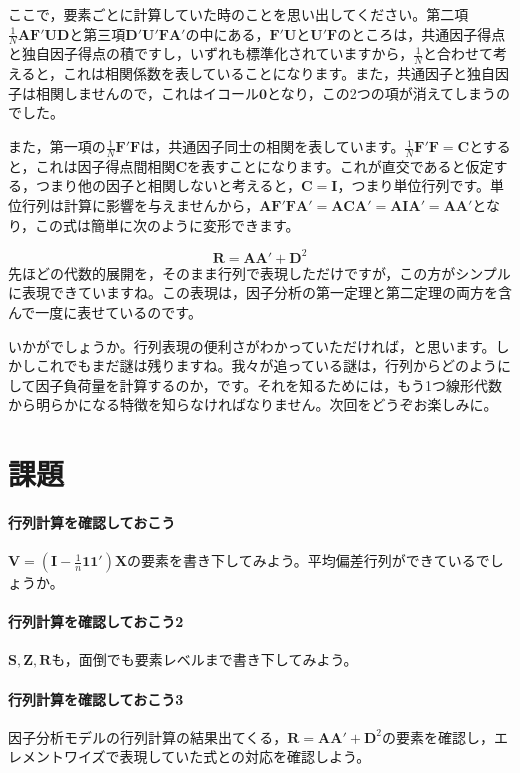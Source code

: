 \documentclass{ltjsbook}
\begin{document}
ここで，要素ごとに計算していた時のことを思い出してください。第二項$\frac{1}{N} \bm{A} \bm{F}'\bm{U} \bm{D}$と第三項$\bm{D}' \bm{U}' \bm{F} \bm{A}'$の中にある，$\bm{F}' \bm{U}$と$\bm{U}' \bm{F}$のところは，共通因子得点と独自因子得点の積ですし，いずれも標準化されていますから，$\frac{1}{N}$と合わせて考えると，これは相関係数を表していることになります。また，共通因子と独自因子は相関しませんので，これはイコール$\bm{0}$となり，この2つの項が消えてしまうのでした。

また，第一項の$\frac{1}{N}\bm{F} ' \bm{F}$は，共通因子同士の相関を表しています。$\frac{1}{N}\bm{F'F}=\bm{C}$とすると，これは因子得点間相関$\bm{C}$を表すことになります。これが直交であると仮定する，つまり他の因子と相関しないと考えると，$\bm{C} = \bm{I}$，つまり単位行列です。単位行列は計算に影響を与えませんから，$\bm{AF'FA'}=\bm{ACA'}=\bm{AIA'}=\bm{AA'}$となり，この式は簡単に次のように変形できます。

\begin{equation}
	\bm{R} = \bm{A} \bm{A} ' + \bm{D}^2
\end{equation}
先ほどの代数的展開を，そのまま行列で表現しただけですが，この方がシンプルに表現できていますね。この表現は，因子分析の第一定理と第二定理の両方を含んで一度に表せているのです。

いかがでしょうか。行列表現の便利さがわかっていただければ，と思います。しかしこれでもまだ謎は残りますね。我々が追っている謎は，行列からどのようにして因子負荷量を計算するのか，です。それを知るためには，もう1つ線形代数から明らかになる特徴を知らなければなりません。次回をどうぞお楽しみに。
\section{課題}
\paragraph{行列計算を確認しておこう}$ \bm{V} = ( \bm{I} -\frac{1}{n}\bm{1} \bm{1} ')\bm{X} $の要素を書き下してみよう。平均偏差行列ができているでしょうか。
\paragraph{行列計算を確認しておこう2}$ \bm{S},\bm{Z},\bm{R}$も，面倒でも要素レベルまで書き下してみよう。
\paragraph{行列計算を確認しておこう3}因子分析モデルの行列計算の結果出てくる，$\bm{R} = \bm{A} \bm{A} ' + \bm{D}^2$の要素を確認し，エレメントワイズで表現していた式との対応を確認しよう。
\end{document}

